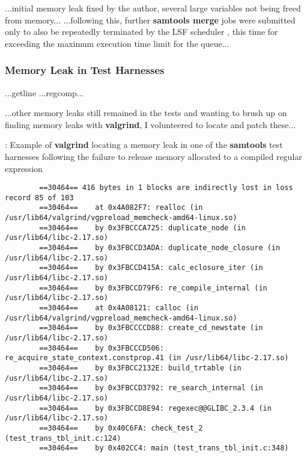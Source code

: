 ...initial memory leak fixed by the author, several large variables not being
freed from memory...
...following this, further \textbf{samtools merge} jobs were submitted only to
also be repeatedly terminated by the LSF scheduler , this time for exceeding the
maximum execution time limit for the queue...

\subsubsection{Memory Leak in Test Harnesses}
...getline
...regcomp...

...other memory leaks still remained in the tests and wanting to brush up on
finding memory leaks with \textbf{valgrind}, I volunteered to locate and patch
these...


\begin{listing}[H]
    \caption[valgrind-regex]{: Example of \textbf{valgrind} locating a memory
        leak in one of the \textbf{samtools} test harnesses following the failure
        to release memory allocated to a compiled regular expression}
    \label{list:valgrind-regex}
    \begin{verbatim}
        ==30464== 416 bytes in 1 blocks are indirectly lost in loss record 85 of 103
        ==30464==    at 0x4A082F7: realloc (in /usr/lib64/valgrind/vgpreload_memcheck-amd64-linux.so)
        ==30464==    by 0x3FBCCCA725: duplicate_node (in /usr/lib64/libc-2.17.so)
        ==30464==    by 0x3FBCCD3ADA: duplicate_node_closure (in /usr/lib64/libc-2.17.so)
        ==30464==    by 0x3FBCCD415A: calc_eclosure_iter (in /usr/lib64/libc-2.17.so)
        ==30464==    by 0x3FBCCD79F6: re_compile_internal (in /usr/lib64/libc-2.17.so)
        ==30464==    at 0x4A08121: calloc (in /usr/lib64/valgrind/vgpreload_memcheck-amd64-linux.so)
        ==30464==    by 0x3FBCCCCD88: create_cd_newstate (in /usr/lib64/libc-2.17.so)
        ==30464==    by 0x3FBCCCD506: re_acquire_state_context.constprop.41 (in /usr/lib64/libc-2.17.so)
        ==30464==    by 0x3FBCC2132E: build_trtable (in /usr/lib64/libc-2.17.so)
        ==30464==    by 0x3FBCCD3792: re_search_internal (in /usr/lib64/libc-2.17.so)
        ==30464==    by 0x3FBCCD8E94: regexec@@GLIBC_2.3.4 (in /usr/lib64/libc-2.17.so)
        ==30464==    by 0x40C6FA: check_test_2 (test_trans_tbl_init.c:124)
        ==30464==    by 0x402CC4: main (test_trans_tbl_init.c:348)
    \end{verbatim}
\end{listing}

